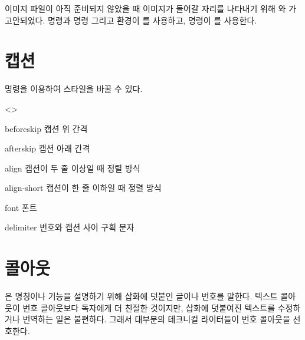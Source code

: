 \documentclass[pairquote, minted]{hzguide}
\begin{document}
\begin{code}
\fakeimage[text]
\fakeimg[text]
\end{code}

이미지 파일이 아직 준비되지 않았을 때 이미지가 들어갈 자리를 나타내기 위해 \macro{\fakeimage}와 \macro{\fakeimg}가 고안되었다.
\macro{\image} 명령과 \macro{\listimg*} 명령 그리고  환경이 \macro{\fakeimage}를 사용하고, \macro{\img*} 명령이 \macro{\fakeimg}를 사용한다.

\begin{coderesult}
\end{coderesult}


\section{캡션}

\macro{\CaptionSetup} 명령을 이용하여  스타일을 바꿀 수 있다.

\begin{code}
\end{code}

\begin{macros}<\CaptionSetup>
\item[beforeskip] \keyvalue{1ex}
캡션 위 간격

\item[afterskip] \keyvalue{1ex}
캡션 아래 간격
\item[align] \keyvalue{\raggedright, \centering}
캡션이 두 줄 이상일 때 정렬 방식

\item[align-short] \keyvalue{\centering}
캡션이 한 줄 이하일 때 정렬 방식

\item[font] \keyvalue{\beseries\small}
폰트

\item[delimiter] \keyvalue{:}
번호와 캡션 사이 구획 문자
\end{macros}

\section{콜아웃}

은 명칭이나 기능을 설명하기 위해 삽화에 덧붙인 글이나 번호를 말한다.
텍스트 콜아웃이 번호 콜아웃보다 독자에게 더 친절한 것이지만, 삽화에 덧붙여진 텍스트를 수정하거나 번역하는 일은 불편하다.
그래서 대부분의 테크니컬 라이터들이 번호 콜아웃을 선호한다.
\end{document}
